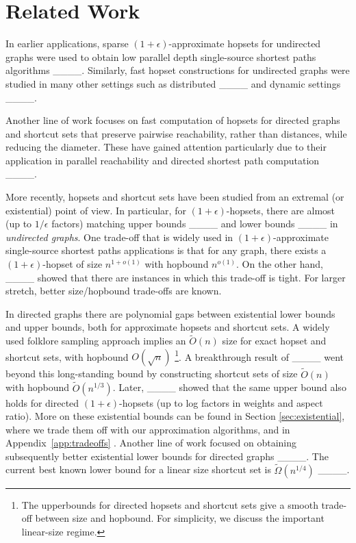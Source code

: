 \section{Related Work}
\label{sec:related_work}

In earlier applications, sparse $(1+\epsilon)$-approximate hopsets for undirected graphs were used to obtain low parallel depth single-source shortest paths algorithms ____. Similarly, fast hopset constructions for undirected graphs were studied in many other settings such as distributed ____ and dynamic settings ____.

Another line of work focuses on fast computation of hopsets for directed graphs and shortcut sets that preserve pairwise reachability, rather than distances, while reducing the diameter. These have gained attention particularly due to their application in parallel reachability and directed shortest path computation ____.

More recently, hopsets and shortcut sets have been studied from an extremal (or existential) point of view.
In particular, for $(1+\epsilon)$-hopsets, there are almost (up to $1/\epsilon$ factors) matching upper bounds ____ and lower bounds ____ in \emph{undirected graphs}. One trade-off that is widely used in $(1+\epsilon)$-approximate single-source shortest paths applications is that for any graph, there exists a $(1+\epsilon)$-hopset of size $n^{1+o(1)}$ with hopbound $n^{o(1)}$.  On the other hand, ____ showed that there are instances in which this trade-off is tight. For larger stretch, better size/hopbound trade-offs are known.

In directed graphs there are polynomial gaps between existential lower bounds and upper bounds, both for approximate hopsets and shortcut sets. A widely used folklore sampling approach implies an $\widetilde{O}(n)$ size for exact hopset and shortcut sets, with hopbound $O(\sqrt{n})$ \footnote{The upperbounds for directed hopsets and shortcut sets give a smooth trade-off between size and hopbound. For simplicity, we discuss the important linear-size regime.}.
A breakthrough result of ____ went beyond this long-standing bound by constructing shortcut sets of size $\widetilde{O}(n)$ with hopbound $\widetilde{O}(n^{1/3})$. 
Later, ____ showed that the same upper bound also holds for directed $(1+\epsilon)$-hopsets (up to log factors in weights and aspect ratio). More on these existential bounds can be found in Section \ref{sec:existential}, where we trade them off with our approximation algorithms\iflong \else, and in Appendix~\ref{app:tradeoffs} \fi. Another line of work focused on obtaining subsequently better existential lower bounds for directed graphs ____. The current best known lower bound for a linear size shortcut set is $\widetilde{\Omega}(n^{1/4})$ ____. 

